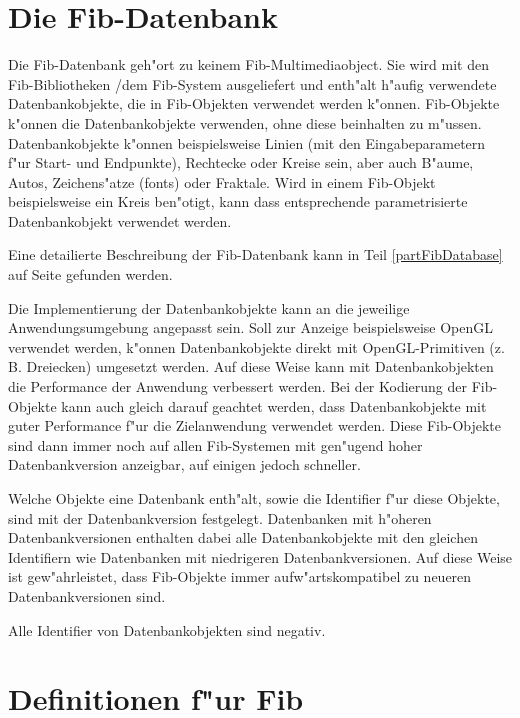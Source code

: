 

\section{Die Fib-Datenbank}
\label{secFibDatabase}

Die Fib-Datenbank geh"ort zu keinem Fib-Multimediaobject. Sie wird mit den Fib-Bib\-lio\-the\-ken /dem Fib-System ausgeliefert und enth"alt h"aufig verwendete Datenbankobjekte, die in Fib-Objekten verwendet werden k"onnen. Fib-Objekte k"onnen die Datenbankobjekte verwenden, ohne diese beinhalten zu m"ussen. Datenbankobjekte k"onnen beispielsweise Linien (mit den Eingabeparametern f"ur Start- und Endpunkte), Recht\-ecke oder Kreise sein, aber auch B"aume, Autos, Zeichens"atze (fonts) oder Fraktale. Wird in einem Fib-Objekt beispielsweise ein Kreis ben"otigt, kann dass entsprechende parametrisierte Datenbankobjekt verwendet werden.

Eine detailierte Beschreibung der Fib-Datenbank kann in Teil \ref{partFibDatabase} auf Seite \pageref{partFibDatabase} gefunden werden.

Die Implementierung der Datenbankobjekte kann an die jeweilige Anwendungsumgebung angepasst sein. Soll zur Anzeige beispielsweise OpenGL verwendet werden, k"onnen Datenbankobjekte direkt mit OpenGL-Primitiven (z. B. Dreiecken) umgesetzt werden. Auf diese Weise kann mit Datenbankobjekten die Performance der Anwendung verbessert werden. Bei der Kodierung der Fib-Objekte kann auch gleich darauf geachtet werden, dass Datenbankobjekte mit guter Performance f"ur die Zielanwendung verwendet werden. Diese Fib-Objekte sind dann immer noch auf allen Fib-Systemen mit gen"ugend hoher Datenbankversion anzeigbar, auf einigen jedoch schneller.

Welche Objekte eine Datenbank enth"alt, sowie die Identifier f"ur diese Objekte, sind mit der Datenbankversion festgelegt. Datenbanken mit h"oheren Datenbankversionen enthalten dabei alle Datenbankobjekte mit den gleichen Identifiern wie Datenbanken mit niedrigeren Datenbankversionen. Auf diese Weise ist gew"ahrleistet, dass Fib-Objekte immer aufw"artskompatibel zu neueren Datenbankversionen sind.

Alle Identifier von Datenbankobjekten sind negativ.



\section{Definitionen f"ur Fib}
\label{secDefinitionsForFib}

